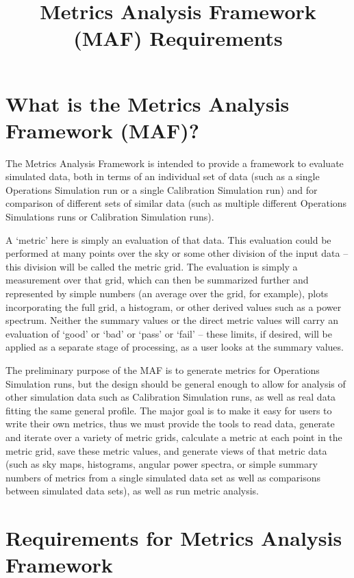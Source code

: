 \documentclass[11pt, preprint]{aastex}
\title{Metrics Analysis Framework (MAF) Requirements}
\author{}
\date{} %
\begin{document}
\maketitle

\section{What is the Metrics Analysis Framework (MAF)?}

The Metrics Analysis Framework is intended to provide a framework to
evaluate simulated data, both in terms of an individual set of data
(such as a single Operations Simulation run or a single Calibration
Simulation run) and for comparison of different sets of similar data
(such as multiple different Operations Simulations runs or Calibration
Simulation runs).

A `metric' here is simply an evaluation of that data. This evaluation
could be performed at many points over the sky or some other division
of the input data -- this division will be called the metric grid. The
evaluation is simply a measurement over that grid, which can then be
summarized further and represented by simple numbers (an average over
the grid, for example), plots incorporating the full grid, a
histogram, or other derived values such as a power spectrum. Neither
the summary values or the direct metric values will carry an
evaluation of `good' or `bad' or `pass' or `fail' -- these limits, if
desired, will be applied as a separate stage of processing, as a user
looks at the summary values.

The preliminary purpose of the MAF is to generate metrics for
Operations Simulation runs, but the design should be general enough to
allow for analysis of other simulation data such as Calibration
Simulation runs, as well as real data fitting the same general
profile. The major goal is to make it easy for users to write their own metrics,
thus we must provide the tools to read data, generate and iterate over a variety of metric grids, 
calculate a metric at each point in the metric grid, save these metric values, and generate
views of that metric data (such as sky maps, histograms, angular power spectra, or simple summary numbers of metrics
from a single simulated data set as well as comparisons between simulated data sets),
as well as run metric analysis. 

\section{Requirements for Metrics Analysis Framework}
\end{document}
